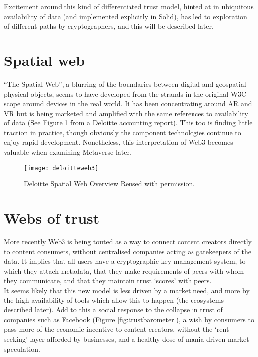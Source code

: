 Excitement around this kind of differentiated trust model, hinted at in ubiquitous availability of data (and implemented explicitly in Solid), has led to exploration of different paths by cryptographers, and this will be described later.\\
\section{Spatial web}
``The Spatial Web'', a blurring of the boundaries between digital and geospatial physical objects, seems to have developed from the strands in the original W3C scope around devices in the real world. It has been concentrating around AR and VR but is being marketed and amplified with the same references to availability of data (See Figure \ref{fig:deloitteSpatial} from a Deloitte accounting report). This too is finding little traction in practice, though obviously the component technologies continue to enjoy rapid development. Nonetheless, this interpretation of Web3 becomes valuable when examining Metaverse later.\\
\begin{figure}
  \centering
    \texttt{[image: deloitteweb3]}
  \caption{\href{https://www2.deloitte.com/us/en/insights/topics/digital-transformation/web-3-0-technologies-in-business.html}{Deloitte Spatial Web Overview} Reused with permission.}
  \label{fig:deloitteSpatial}
\end{figure}
\section{Webs of trust}
More recently Web3 is \href{https://trends.google.com/trends/explore?date=all&q=web3}{being touted} as a way to connect content creators directly to content consumers, without centralised companies acting as gatekeepers of the data. It implies that all users have a cryptographic key management system, to which they attach metadata, that they make requirements of peers with whom they communicate, and that they maintain trust `scores' with peers.\\
It seems likely that this new model is less driven by a market need, and more by the high availability of tools which allow this to happen (the ecosystems described later). Add to this a social response to the \href{https://finance.yahoo.com/news/meta-facebook-worst-company-of-the-year-yahoo-finance-165345819.html}{collapse in trust of companies such as Facebook} (Figure \ref{fig:trustbarometer}), a wish by consumers to pass more of the economic incentive to content creators, without the `rent seeking' layer afforded by businesses, and a healthy dose of mania driven market speculation. 

